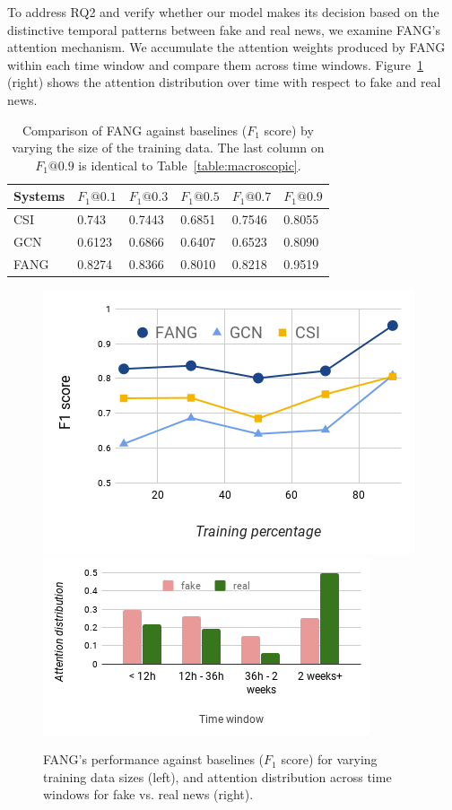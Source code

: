 \documentclass[sigconf,anonymous]{acmart}
\theoremstyle{definition}
\theoremstyle{hypothesis}
\begin{document}
To address RQ2 and verify whether our model makes its decision based on the distinctive temporal patterns between fake and real news, we examine FANG's attention mechanism. We accumulate the attention weights produced by FANG within each time window and compare them across time windows. Figure~\ref{fig:limited_and_attention} (right) shows the attention distribution over time with respect to fake and real news.
\begin{table}[t]
    \centering
    \small
    \caption{Comparison of FANG against baselines ($F_1$ score) by varying the size of the training data. The last column on $F_1@0.9$ is identical to Table~\ref{table:macroscopic}.}
    \begin{tabular}{l  l l l l l} 
    \toprule
        \bf Systems & \bf $F_1@0.1$ & \bf $F_1@0.3$ & \bf $F_1@0.5$ & \bf $F_1@0.7$ & \bf $F_1@0.9$ \\
    \midrule
        CSI & 0.743  & 0.7443  & 0.6851 & 0.7546 & 0.8055 \\
        GCN & 0.6123 & 0.6866  & 0.6407 & 0.6523 & 0.8090 \\ \hline
        FANG & 0.8274 & 0.8366 & 0.8010 & 0.8218 & 0.9519 \\ 
    \bottomrule
    \end{tabular}
    \label{table:limited_data}
\end{table}

\begin{figure}[t]
\centering
\includegraphics[scale=0.25]{chart.png}
\includegraphics[scale=0.35]{fang_attention.png}
\caption{FANG's performance against baselines ($F_1$ score) for varying training data sizes (left), and attention distribution across time windows for fake vs. real news (right).}
\label{fig:limited_and_attention}
\end{figure}
\end{document}
